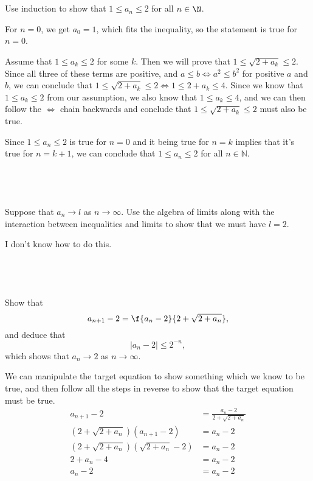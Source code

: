 \documentclass[a4paper]{article}
\begin{document}
\subsection{~} %

\begin{questionbody}
Use induction to show that $1 \le a_n \le 2$ for all $n \in \N$.
\end{questionbody}

For $n=0$, we get $a_0 = 1$, which fits the inequality, so the statement is true for $n=0$.

Assume that $1 \le a_k \le 2$ for some $k$. Then we will prove that $1 \le \sqrt{2 + a_k} \le 2$. Since all three of these terms are positive, and $a \le b \iff a^2 \le b^2$ for positive $a$ and $b$, we can conclude that $1 \le \sqrt{2 + a_k} \le 2 \iff 1 \le 2 + a_k \le 4$. Since we know that $1 \le a_k \le 2$ from our assumption, we also know that $1 \le a_k \le 4$, and we can then follow the $\iff$ chain backwards and conclude that $1 \le \sqrt{2 + a_k} \le 2$ must also be true.

Since $1 \le a_n \le 2$ is true for $n=0$ and it being true for $n=k$ implies that it's true for $n=k+1$, we can conclude that $1 \le a_n \le 2$ for all $n \in \mathbb N$.

\subsection{~} %

\begin{questionbody}
Suppose that $a_n \to l$ as $n \to \infty$. Use the algebra of limits along with the interaction between inequalities and limits to show that we must have $l = 2$.
\end{questionbody}

I don't know how to do this.

\newpage
\subsection{~} %

\begin{questionbody}
Show that \[
a_{n+1} - 2 = \f{a_n - 2}{2 + \sqrt{2 + a_n}},
\] and deduce that \[
|a_n - 2| \le 2^{-n},
\] which shows that $a_n \to 2$ as $n \to \infty$.
\end{questionbody}

We can manipulate the target equation to show something which we know to be true, and then follow all the steps in reverse to show that the target equation must be true.
\begin{align*}
    a_{n+1} - 2 &= \frac{a_n - 2}{2 + \sqrt{2 + a_n}} \\
    \left( 2 + \sqrt{2 + a_n} \right) (a_{n+1} - 2) &= a_n - 2 \\
    \left( 2 + \sqrt{2 + a_n} \right) \left( \sqrt{2 + a_n} - 2 \right) &= a_n - 2 \\
    2 + a_n - 4 &= a_n - 2 \\
    a_n - 2 &= a_n - 2
\end{align*}
\end{document}
